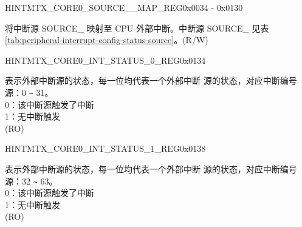 \begin{register}{H}{INTMTX\_CORE0\_SOURCE\_\_MAP\_REG}{0x0034 - 0x0130}\label{regdesc:INTMTXCORE0SOURCEXMAPREG}
%
%
\regnewline%
\begin{regdesc}\begin{reglist}
\label{fielddesc:INTMTXCORE0SOURCEXMAP}\item [INTMTX\_CORE0\_SOURCE\_\regindex{X}\_MAP] 将中断源 SOURCE\_ 映射至 CPU 外部中断。中断源 SOURCE\_ 见表 \ref{tab:peripheral-interrupt-config-status-source}。(R/W)
\end{reglist}\end{regdesc}
\end{register}


\begin{register}{H}{INTMTX\_CORE0\_INT\_STATUS\_0\_REG}{0x0134}\label{regdesc:INTMTXCORE0INTSTATUS0REG}
%
\regnewline%
\begin{regdesc}\begin{reglist}
\label{fielddesc:INTMTXCORE0INTSTATUS0}\item [INTMTX\_CORE0\_INT\_STATUS\_0] 表示外部中断源的状态，每一位均代表一个外部中断
源的状态，对应中断编号源：0 \verb+~+ 31。\\
0：该中断源触发了中断\\
1：无中断触发\\
(RO)
\end{reglist}\end{regdesc}
\end{register}


\begin{register}{H}{INTMTX\_CORE0\_INT\_STATUS\_1\_REG}{0x0138}\label{regdesc:INTMTXCORE0INTSTATUS1REG}
%
\regnewline%
\begin{regdesc}\begin{reglist}
\label{fielddesc:INTMTXCORE0INTSTATUS1}\item [INTMTX\_CORE0\_INT\_STATUS\_1] 表示外部中断源的状态，每一位均代表一个外部中断
源的状态，对应中断编号源：32 \verb+~+ 63。\\
0：该中断源触发了中断\\
1：无中断触发\\
(RO)
\end{reglist}\end{regdesc}
\end{register}


